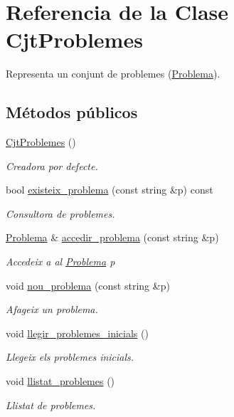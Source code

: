 \hypertarget{class_cjt_problemes}{}\section{Referencia de la Clase Cjt\+Problemes}
\label{class_cjt_problemes}


Representa un conjunt de problemes (\mbox{\hyperlink{class_problema}{Problema}}).  


\subsection*{Métodos públicos}
\begin{DoxyCompactItemize}
\item 
\mbox{\hyperlink{class_cjt_problemes_ae6f76d8e493e80bba4fc28a124826cb5}{Cjt\+Problemes}} ()
\begin{DoxyCompactList}\small\item\em Creadora por defecte. \end{DoxyCompactList}\item 
bool \mbox{\hyperlink{class_cjt_problemes_a27f5be292f79fd47915093fb84013e67}{existeix\+\_\+problema}} (const string \&p) const
\begin{DoxyCompactList}\small\item\em Consultora de problemes. \end{DoxyCompactList}\item 
\mbox{\hyperlink{class_problema}{Problema}} \& \mbox{\hyperlink{class_cjt_problemes_ae0db90032709a9d6af8312b93877d514}{accedir\+\_\+problema}} (const string \&p)
\begin{DoxyCompactList}\small\item\em Accedeix a al \mbox{\hyperlink{class_problema}{Problema}} {\itshape p} \end{DoxyCompactList}\item 
void \mbox{\hyperlink{class_cjt_problemes_a7a41c837128c629f7a4dcf81b1592581}{nou\+\_\+problema}} (const string \&p)
\begin{DoxyCompactList}\small\item\em Afageix un problema. \end{DoxyCompactList}\item 
void \mbox{\hyperlink{class_cjt_problemes_ac320f52e566402ed341d2f67176be14a}{llegir\+\_\+problemes\+\_\+inicials}} ()
\begin{DoxyCompactList}\small\item\em Llegeix els problemes inicials. \end{DoxyCompactList}\item 
void \mbox{\hyperlink{class_cjt_problemes_a976ab13903046970b2e128a3fa4df8fa}{llistat\+\_\+problemes}} ()
\begin{DoxyCompactList}\small\item\em Llistat de problemes. \end{DoxyCompactList}\end{DoxyCompactItemize}


